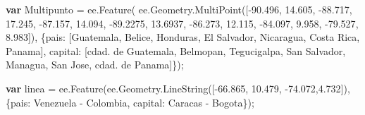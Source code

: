 \documentclass[
  12pt,
  letterpaper,
  twoside]{book}
\newenvironment{Shaded}{\begin{snugshade}}{\end{snugshade}}
\newcommand{\AttributeTok}[1]{\textcolor[rgb]{0.48,0.12,0.64}{#1}}
\newcommand{\ControlFlowTok}[1]{\textcolor[rgb]{0.00,0.00,0.00}{\textbf{#1}}}
\newcommand{\DataTypeTok}[1]{\textcolor[rgb]{0.00,0.00,0.00}{#1}}
\newcommand{\FloatTok}[1]{\textcolor[rgb]{0.28,0.53,0.93}{#1}}
\newcommand{\FunctionTok}[1]{\textcolor[rgb]{0.48,0.12,0.64}{#1}}
\newcommand{\KeywordTok}[1]{\textcolor[rgb]{0.48,0.12,0.64}{#1}}
\newcommand{\NormalTok}[1]{#1}
\newcommand{\OperatorTok}[1]{\textcolor[rgb]{0.00,0.00,0.00}{#1}}
\newcommand{\StringTok}[1]{\textcolor[rgb]{0.87,0.29,0.22}{#1}}
\begin{document}
\begin{Shaded}
\begin{Highlighting}[]
\ControlFlowTok{var}\NormalTok{ Multipunto }\OperatorTok{=} \KeywordTok{ee}\OperatorTok{.}\FunctionTok{Feature}\NormalTok{(}
\KeywordTok{ee}\OperatorTok{.}\AttributeTok{Geometry}\OperatorTok{.}\FunctionTok{MultiPoint}\NormalTok{([}\OperatorTok{{-}}\FloatTok{90.496}\OperatorTok{,} \FloatTok{14.605}\OperatorTok{,} \OperatorTok{{-}}\FloatTok{88.717}\OperatorTok{,} \FloatTok{17.245}\OperatorTok{,}                            
                        \OperatorTok{{-}}\FloatTok{87.157}\OperatorTok{,} \FloatTok{14.094}\OperatorTok{,} \OperatorTok{{-}}\FloatTok{89.2275}\OperatorTok{,} \FloatTok{13.6937}\OperatorTok{,}
                        \OperatorTok{{-}}\FloatTok{86.273}\OperatorTok{,} \FloatTok{12.115}\OperatorTok{,} \OperatorTok{{-}}\FloatTok{84.097}\OperatorTok{,} \FloatTok{9.958}\OperatorTok{,}
                        \OperatorTok{{-}}\FloatTok{79.527}\OperatorTok{,} \FloatTok{8.983}\NormalTok{])}\OperatorTok{,}
\NormalTok{    \{}\DataTypeTok{pais}\OperatorTok{:}\NormalTok{ [}\StringTok{\textquotesingle{}Guatemala\textquotesingle{}}\OperatorTok{,} \StringTok{\textquotesingle{}Belice\textquotesingle{}}\OperatorTok{,} 
        \StringTok{\textquotesingle{}Honduras\textquotesingle{}}\OperatorTok{,} \StringTok{\textquotesingle{}El Salvador\textquotesingle{}}\OperatorTok{,} 
        \StringTok{\textquotesingle{}Nicaragua\textquotesingle{}}\OperatorTok{,} \StringTok{\textquotesingle{}Costa Rica\textquotesingle{}}\OperatorTok{,} 
        \StringTok{\textquotesingle{}Panama\textquotesingle{}}\NormalTok{]}\OperatorTok{,}
    \DataTypeTok{capital}\OperatorTok{:}\NormalTok{    [}\StringTok{\textquotesingle{}cdad. de Guatemala\textquotesingle{}}\OperatorTok{,} \StringTok{\textquotesingle{}Belmopan\textquotesingle{}}\OperatorTok{,} 
        \StringTok{\textquotesingle{}Tegucigalpa\textquotesingle{}}\OperatorTok{,} \StringTok{\textquotesingle{}San Salvador\textquotesingle{}}\OperatorTok{,} 
        \StringTok{\textquotesingle{}Managua\textquotesingle{}}\OperatorTok{,} \StringTok{\textquotesingle{}San Jose\textquotesingle{}}\OperatorTok{,} 
        \StringTok{\textquotesingle{}cdad. de Panama\textquotesingle{}}\NormalTok{]\})}\OperatorTok{;}

\ControlFlowTok{var}\NormalTok{ linea }\OperatorTok{=} \KeywordTok{ee}\OperatorTok{.}\FunctionTok{Feature}\NormalTok{(}\KeywordTok{ee}\OperatorTok{.}\AttributeTok{Geometry}\OperatorTok{.}\FunctionTok{LineString}\NormalTok{([}\OperatorTok{{-}}\FloatTok{66.865}\OperatorTok{,} \FloatTok{10.479}\OperatorTok{,}                    
                            \OperatorTok{{-}}\FloatTok{74.072}\OperatorTok{,}\FloatTok{4.732}\NormalTok{])}\OperatorTok{,}
\NormalTok{        \{}\DataTypeTok{pais}\OperatorTok{:} \StringTok{\textquotesingle{}Venezuela {-} Colombia\textquotesingle{}}\OperatorTok{,} 
      \DataTypeTok{capital}\OperatorTok{:} \StringTok{\textquotesingle{}Caracas {-} Bogota\textquotesingle{}}\NormalTok{\})}\OperatorTok{;} 


\end{Highlighting}
\end{Shaded}
\end{document}

